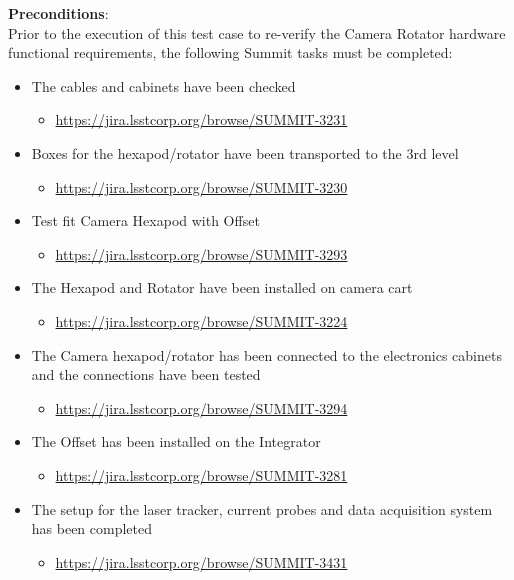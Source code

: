 \documentclass[SE,lsstdraft,STR,toc]{lsstdoc}
\providecommand{\tightlist}{
  \setlength{\itemsep}{0pt}\setlength{\parskip}{0pt}}
\begin{document}
    \textbf{ Preconditions}:\\
    {Prior to the execution of this test case to re-verify the Camera
Rotator hardware functional requirements, the following Summit tasks
must be completed:}

\begin{itemize}
\tightlist
\item
  The cables and cabinets have been checked~

  \begin{itemize}
  \tightlist
  \item
    \url{https://jira.lsstcorp.org/browse/SUMMIT-3231}
  \end{itemize}
\item
  Boxes for the hexapod/rotator have been transported to the 3rd level

  \begin{itemize}
  \tightlist
  \item
    \url{https://jira.lsstcorp.org/browse/SUMMIT-3230}
  \end{itemize}
\item
  Test fit Camera Hexapod with Offset

  \begin{itemize}
  \tightlist
  \item
    \url{https://jira.lsstcorp.org/browse/SUMMIT-3293}
  \end{itemize}
\item
  The Hexapod and Rotator have been installed on camera cart

  \begin{itemize}
  \tightlist
  \item
    \url{https://jira.lsstcorp.org/browse/SUMMIT-3224}
  \end{itemize}
\item
  The Camera hexapod/rotator has been connected to the electronics
  cabinets and the connections have been tested

  \begin{itemize}
  \tightlist
  \item
    \url{https://jira.lsstcorp.org/browse/SUMMIT-3294}
  \end{itemize}
\item
  The Offset has been installed on the Integrator

  \begin{itemize}
  \tightlist
  \item
    \url{https://jira.lsstcorp.org/browse/SUMMIT-3281}
  \end{itemize}
\item
  The setup for the laser tracker, current probes and data acquisition
  system has been completed

  \begin{itemize}
  \tightlist
  \item
    \url{https://jira.lsstcorp.org/browse/SUMMIT-3431}
  \end{itemize}
\end{itemize}
\end{document}

